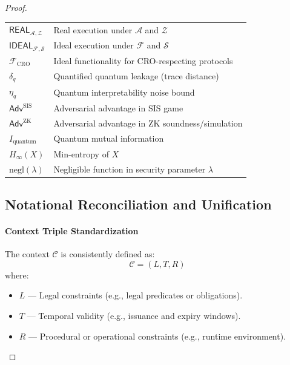 \documentclass[preprint,12pt]{elsarticle}
\newcommand{\negl}{\mathrm{negl}}
\newcommand{\Adv}{\mathsf{Adv}}
\begin{document}
\begin{proof}
\begin{table}[H]
\begin{tabular}{@{}ll@{}}
                    $\mathsf{REAL}_{\mathcal{A},\mathcal{Z}}$ & Real execution under $\mathcal{A}$ and $\mathcal{Z}$ \\
                    $\mathsf{IDEAL}_{\mathcal{F},\mathcal{S}}$ & Ideal execution under $\mathcal{F}$ and $\mathcal{S}$ \\
                    $\mathcal{F}_{\text{CRO}}$ & Ideal functionality for CRO-respecting protocols \\
                    $\delta_q$ & Quantified quantum leakage (trace distance) \\
                    $\eta_q$ & Quantum interpretability noise bound \\
                    $\Adv^{\text{SIS}}$ & Adversarial advantage in SIS game \\
                    $\Adv^{\text{ZK}}$ & Adversarial advantage in ZK soundness/simulation \\
                    $I_{\text{quantum}}$ & Quantum mutual information \\
                    $H_\infty(X)$ & Min-entropy of $X$ \\
                    $\negl(\lambda)$ & Negligible function in security parameter $\lambda$ \\
                    \bottomrule
                \end{tabular}
            \end{table}

            \subsection{Notational Reconciliation and Unification}
                \label{subsec:notation_reconciliation}

                \paragraph{Context Triple Standardization}  
                The context $\mathcal{C}$ is consistently defined as:
                \begin{equation}
                    \mathcal{C} = (L, T, R)
                \end{equation}
                where:
                \begin{itemize}
                    \item $L$ — Legal constraints (e.g., legal predicates or obligations).
                    \item $T$ — Temporal validity (e.g., issuance and expiry windows).
                    \item $R$ — Procedural or operational constraints (e.g., runtime environment).
                \end{itemize}


\end{proof}
\end{document}
